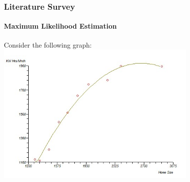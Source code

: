 \documentclass[handout,9pt]{beamer}
\numberwithin{theorem}{section}
\begin{document}
\begin{frame}
	\begin{spacing}{1}
		\frametitle{Literature Survey}
		\framesubtitle{Maximum Likelihood Estimation}
		Consider the following graph:\\
		\includegraphics[height=7cm]{graph4}\\ 
	\end{spacing}
\end{frame}
\end{document}
